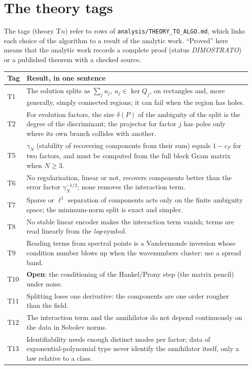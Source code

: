 \documentclass[11pt,a4paper]{article}
\theoremstyle{definition}
\newcommand{\thy}[1]{\textcolor{cG}{\textsf{\footnotesize(theory #1)}}}
\begin{document}
\section{The theory tags}\label{app:tags}
The tags \thy{T$n$} refer to rows of \texttt{analysis/THEORY\_TO\_ALGO.md}, which links each choice of the algorithm to a result of the analytic work. ``Proved'' here means that the analytic work records a complete proof (status \emph{DIMOSTRATO}) or a published theorem with a checked source.
\begin{center}\small
\begin{tabular}{@{}L{1.0cm}L{12.0cm}@{}}
\toprule
Tag & Result, in one sentence\\\midrule
T1 & The solution splits as $\sum_j u_j$, $u_j\in\ker Q_j$, on rectangles and, more generally, simply connected regions; it can fail when the region has holes.\\
T2 & For evolution factors, the size $\delta(P)$ of the ambiguity of the split is the degree of the discriminant; the projector for factor $j$ has poles only where its own branch collides with another.\\
T5 & $\gamma_N$ (stability of recovering components from their sum) equals $1-c_F$ for two factors, and must be computed from the full block Gram matrix when $N\ge3$.\\
T6 & No regularisation, linear or not, recovers components better than the error factor $\gamma_N^{-1/2}$; none removes the interaction term.\\
T7 & Sparse or $\ell^1$ separation of components acts only on the finite ambiguity space; the minimum-norm split is exact and simpler.\\
T8 & No stable linear encoder makes the interaction term vanish; terms are read linearly from the \emph{log}-symbol.\\
T9 & Reading terms from spectral points is a Vandermonde inversion whose condition number blows up when the wavenumbers cluster: use a spread band.\\
T10 & \textbf{Open}: the conditioning of the Hankel/Prony step (the matrix pencil) under noise.\\
T11 & Splitting loses one derivative: the components are one order rougher than the field.\\
T12 & The interaction term and the annihilator do not depend continuously on the data in Sobolev norms.\\
T13 & Identifiability needs enough distinct modes per factor; data of exponential-polynomial type never identify the annihilator itself, only a law relative to a class.\\

\end{tabular}
\end{center}
\end{document}
